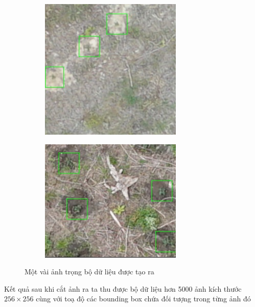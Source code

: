 \documentclass[a4paper, 12pt]{report}
\begin{document}
\begin{figure}[!h]
\begin{subfigure}[!h]{0.45\textwidth}
    \includegraphics[width=\linewidth]{Images/original/Img_RSKA003603_0_r256_c3328}
        \label{fig:subfig2}
    \end{subfigure}
 
    \begin{subfigure}[!h]{0.5\textwidth}
    	\includegraphics[width=\linewidth]{Images/original/Img_RSKA014702_3_r1664_c384}
        \label{fig:subfig3}
    \end{subfigure}
    \caption[Optional caption for list of figures]{Một vài ảnh trọng bộ dữ liệu được tạo ra}
    \label{fig:demo_split}
\end{figure}
Kết quả sau khi cắt ảnh ra ta thu được bộ dữ liệu hơn 5000 ảnh kích thước $256 \times 256$ cùng với toạ độ các bounding box chứa đối tượng trong từng ảnh đó
\end{document}
